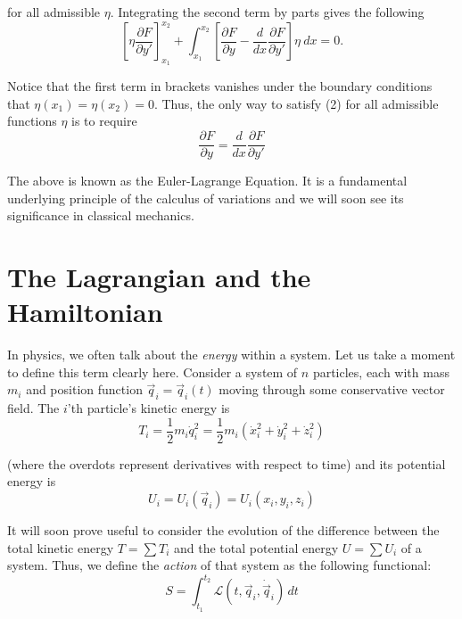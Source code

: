 \documentclass[12pt]{article}
\newcommand{\Lagr}	{\mathscr{L}}		%
\newcommand{\q}		{\vec{q}}
\begin{document}
for all admissible $\eta$. Integrating the second term by parts gives the following
\begin{equation*}
\left[ \eta \frac{\partial F}{\partial y'}\right]_{x_1}^{x_2}
	+   \int_{x_1}^{x_2} \left[ 
		\frac{\partial F}{\partial y} - \frac{d}{dx} 
		\frac{\partial F}{\partial y'} \right] \eta \: dx = 0.
\end{equation*}

Notice that the first term in brackets vanishes under the boundary conditions that $\eta(x_1) = \eta(x_2) = 0$. Thus, the only way to satisfy (2) for all admissible functions $\eta$ is to require
\begin{equation}
\frac{\partial F}{\partial y} 
	= \frac{d}{dx} \frac{\partial F}{\partial y'}
\end{equation}

The above is known as the Euler-Lagrange Equation. It is a fundamental underlying principle of the calculus of variations and we will soon see its significance in classical mechanics.

\pagebreak
\section{The Lagrangian and the Hamiltonian}

In physics, we often talk about the \textit{energy} within a system. Let us take a moment to define this term clearly here. Consider a system of $n$ particles, each with mass $m_i$ and position function $\q_i = \q_i(t)$ moving through some conservative vector field. The $i$'th particle's kinetic energy is
\begin{equation*}
T_i = \frac{1}{2}m_i\dot{q}_i^2 
	= \frac{1}{2}m_i(\dot{x}_i^2 + \dot{y}_i^2 + \dot{z}_i^2)
\end{equation*} 

(where the overdots represent derivatives with respect to time) and its potential energy is
\begin{equation*}
U_i = U_i(\q_i) = U_i(x_i, y_i, z_i)
\end{equation*}

It will soon prove useful to consider the evolution of the difference between the total kinetic energy $T = \sum T_i$ and the total potential energy $U = \sum U_i$ of a system. Thus, we define the \textit{action} of that system as the following functional: 
\begin{equation}
S = \int_{t_1}^{t_2} \Lagr(t, \q_i, \dot{\q}_i) \, dt
\end{equation}
\end{document}
